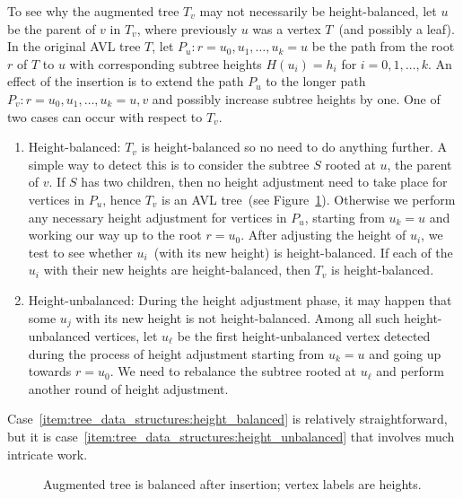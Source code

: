To see why the augmented tree $T_v$ may not necessarily be
height-balanced, let $u$ be the parent of $v$ in $T_v$, where
previously $u$ was a vertex $T$~(and possibly a leaf). In the original
AVL tree $T$, let $P_u: r = u_0, u_1, \dots, u_k = u$ be the path from
the root $r$ of $T$ to $u$ with corresponding subtree heights $H(u_i)
= h_i$ for $i = 0, 1, \dots, k$. An effect of the insertion is to
extend the path $P_u$ to the longer path
$P_v: r = u_0, u_1, \dots, u_k = u, v$ and possibly increase subtree
heights by one. One of two cases can occur with respect to $T_v$.
\begin{enumerate}
\item\label{item:tree_data_structures:height_balanced}
  Height-balanced: $T_v$ is height-balanced so no need to do anything
  further. A simple way to detect this is to consider the subtree $S$
  rooted at $u$, the parent of $v$. If $S$ has two children, then no
  height adjustment need to take place for vertices in $P_u$, hence
  $T_v$ is an AVL tree~(see
  Figure~\ref{fig:tree_data_structures:augmented_tree_balanced_after_insertion}).
  Otherwise we perform any necessary height adjustment for vertices in
  $P_u$, starting from $u_k = u$ and working our way up to the root
  $r = u_0$. After adjusting the height of $u_i$, we test to see
  whether $u_i$~(with its new height) is height-balanced. If each of
  the $u_i$ with their new heights are height-balanced, then $T_v$ is
  height-balanced.

\item\label{item:tree_data_structures:height_unbalanced}
  Height-unbalanced: During the height adjustment phase, it may happen
  that some $u_j$ with its new height is not height-balanced. Among
  all such height-unbalanced vertices, let $u_\ell$ be the first
  height-unbalanced vertex detected during the process of height
  adjustment starting from $u_k = u$ and going up towards
  $r = u_0$. We need to rebalance the subtree rooted at $u_\ell$ and
  perform another round of height adjustment.
\end{enumerate}
Case~\ref{item:tree_data_structures:height_balanced} is relatively
straightforward, but it is
case~\ref{item:tree_data_structures:height_unbalanced} that involves
much intricate work.

\begin{figure}[!htbp]
\centering
{}

\caption{Augmented tree is balanced after insertion; vertex labels are
  heights.}
\label{fig:tree_data_structures:augmented_tree_balanced_after_insertion}
\end{figure}

